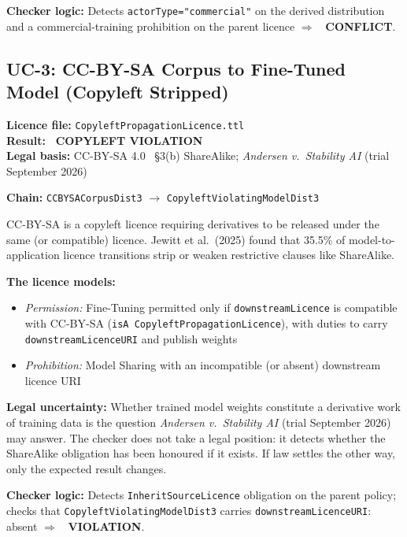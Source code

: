 \documentclass[12pt,a4paper]{article}
\newcommand{\violated}[1]{\textcolor{violation}{\textbf{\texttimes\ #1}}}
\begin{document}
\textbf{Checker logic:} Detects \texttt{actorType="commercial"} on the derived distribution and a commercial-training prohibition on the parent licence $\Rightarrow$ \violated{CONFLICT}.

\subsection{UC-3: CC-BY-SA Corpus to Fine-Tuned Model (Copyleft Stripped)}
\textbf{Licence file:} \texttt{CopyleftPropagationLicence.ttl}\\[2pt]
\textbf{Result:} \violated{COPYLEFT VIOLATION}\\[4pt]
\textbf{Legal basis:} CC-BY-SA 4.0~\cite{ccbysa40} \S 3(b) ShareAlike; \textit{Andersen v.\ Stability AI} (trial September 2026)

\textbf{Chain:} \texttt{CCBYSACorpusDist3} $\rightarrow$ \texttt{CopyleftViolatingModelDist3}

CC-BY-SA is a copyleft licence requiring derivatives to be released under the same (or compatible) licence. Jewitt et al.\ (2025) found that 35.5\% of model-to-application licence transitions strip or weaken restrictive clauses like ShareAlike.

\textbf{The licence models:}
\begin{itemize}[noitemsep]
  \item \emph{Permission:} Fine-Tuning permitted only if \texttt{downstreamLicence} is compatible with CC-BY-SA (\texttt{isA CopyleftPropagationLicence}), with duties to carry \texttt{downstreamLicenceURI} and publish weights
  \item \emph{Prohibition:} Model Sharing with an incompatible (or absent) downstream licence URI
\end{itemize}

\textbf{Legal uncertainty:} Whether trained model weights constitute a derivative work of training data is the question \textit{Andersen v.\ Stability AI} (trial September 2026) may answer. The checker does not take a legal position: it detects whether the ShareAlike obligation has been honoured if it exists. If law settles the other way, only the expected result changes.

\textbf{Checker logic:} Detects \texttt{InheritSourceLicence} obligation on the parent policy; checks that \texttt{CopyleftViolatingModelDist3} carries \texttt{downstreamLicenceURI}: absent $\Rightarrow$ \violated{VIOLATION}.
\end{document}
